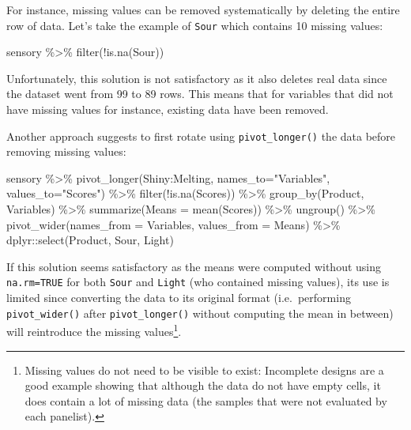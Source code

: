 \documentclass[
]{book}
\newenvironment{Shaded}{\begin{snugshade}}{\end{snugshade}}
\newcommand{\AttributeTok}[1]{\textcolor[rgb]{0.77,0.63,0.00}{#1}}
\newcommand{\FunctionTok}[1]{\textcolor[rgb]{0.00,0.00,0.00}{#1}}
\newcommand{\NormalTok}[1]{#1}
\newcommand{\SpecialCharTok}[1]{\textcolor[rgb]{0.00,0.00,0.00}{#1}}
\newcommand{\StringTok}[1]{\textcolor[rgb]{0.31,0.60,0.02}{#1}}
\begin{document}
For instance, missing values can be removed systematically by deleting the entire row of data. Let's take the example of \texttt{Sour} which contains 10 missing values:

\begin{Shaded}
\begin{Highlighting}[]
\NormalTok{sensory }\SpecialCharTok{\%\textgreater{}\%} 
  \FunctionTok{filter}\NormalTok{(}\SpecialCharTok{!}\FunctionTok{is.na}\NormalTok{(Sour))}
\end{Highlighting}
\end{Shaded}

Unfortunately, this solution is not satisfactory as it also deletes real data since the dataset went from 99 to 89 rows. This means that for variables that did not have missing values for instance, existing data have been removed.

Another approach suggests to first rotate using \texttt{pivot\_longer()} the data before removing missing values:

\begin{Shaded}
\begin{Highlighting}[]
\NormalTok{sensory }\SpecialCharTok{\%\textgreater{}\%} 
  \FunctionTok{pivot\_longer}\NormalTok{(Shiny}\SpecialCharTok{:}\NormalTok{Melting, }\AttributeTok{names\_to=}\StringTok{"Variables"}\NormalTok{, }\AttributeTok{values\_to=}\StringTok{"Scores"}\NormalTok{) }\SpecialCharTok{\%\textgreater{}\%} 
  \FunctionTok{filter}\NormalTok{(}\SpecialCharTok{!}\FunctionTok{is.na}\NormalTok{(Scores)) }\SpecialCharTok{\%\textgreater{}\%} 
  \FunctionTok{group\_by}\NormalTok{(Product, Variables) }\SpecialCharTok{\%\textgreater{}\%} 
  \FunctionTok{summarize}\NormalTok{(}\AttributeTok{Means =} \FunctionTok{mean}\NormalTok{(Scores)) }\SpecialCharTok{\%\textgreater{}\%} 
  \FunctionTok{ungroup}\NormalTok{() }\SpecialCharTok{\%\textgreater{}\%} 
  \FunctionTok{pivot\_wider}\NormalTok{(}\AttributeTok{names\_from =}\NormalTok{ Variables, }\AttributeTok{values\_from =}\NormalTok{ Means) }\SpecialCharTok{\%\textgreater{}\%} 
\NormalTok{  dplyr}\SpecialCharTok{::}\FunctionTok{select}\NormalTok{(Product, Sour, Light)}
\end{Highlighting}
\end{Shaded}

If this solution seems satisfactory as the means were computed without using \texttt{na.rm=TRUE} for both \texttt{Sour} and \texttt{Light} (who contained missing values), its use is limited since converting the data to its original format (i.e.~performing \texttt{pivot\_wider()} after \texttt{pivot\_longer()} without computing the mean in between) will reintroduce the missing values\footnote{Missing values do not need to be visible to exist: Incomplete designs are a good example showing that although the data do not have empty cells, it does contain a lot of missing data (the samples that were not evaluated by each panelist).}.
\end{document}
